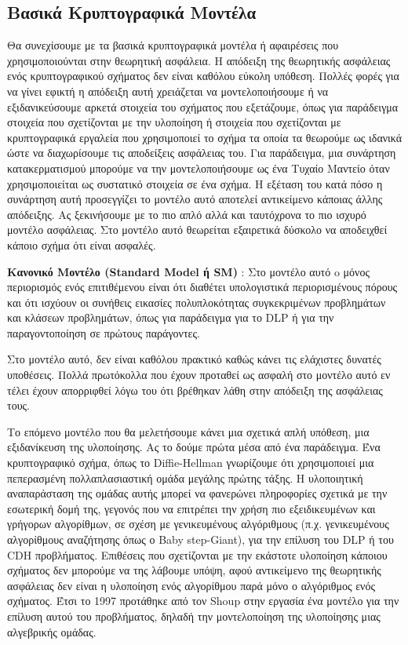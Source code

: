 \subsection{Βασικά Κρυπτογραφικά Μοντέλα}

Θα συνεχίσουμε με τα βασικά κρυπτογραφικά μοντέλα ή αφαιρέσεις που χρησιμοποιούνται στην θεωρητική ασφάλεια. Η απόδειξη της θεωρητικής ασφάλειας ενός κρυπτογραφικού σχήματος δεν είναι καθόλου εύκολη υπόθεση. Πολλές φορές για να γίνει εφικτή η απόδειξη αυτή χρειάζεται να μοντελοποιήσουμε ή να εξιδανικεύσουμε αρκετά στοιχεία του σχήματος που εξετάζουμε, όπως για παράδειγμα στοιχεία που σχετίζονται με την υλοποίηση ή στοιχεία που σχετίζονται με κρυπτογραφικά εργαλεία που χρησιμοποιεί το σχήμα τα οποία τα θεωρούμε ως ιδανικά ώστε να διαχωρίσουμε τις αποδείξεις ασφάλειας του. Για παράδειγμα, μια συνάρτηση κατακερματισμού μπορούμε να την μοντελοποιήσουμε ως ένα Τυχαίο Μαντείο όταν χρησιμοποιείται ως συστατικό στοιχεία σε ένα σχήμα. Η εξέταση του κατά πόσο η συνάρτηση αυτή προσεγγίζει το μοντέλο αυτό αποτελεί αντικείμενο κάποιας άλλης απόδειξης. Ας ξεκινήσουμε με το πιο απλό αλλά και ταυτόχρονα το πιο ισχυρό μοντέλο ασφάλειας. Στο μοντέλο αυτό θεωρείται εξαιρετικά δύσκολο να αποδειχθεί κάποιο σχήμα ότι είναι ασφαλές. 

\begin{definition}
\textbf{Κανονικό Μοντέλο (Standard Model ή SM)} : Στο μοντέλο αυτό o μόνος περιορισμός ενός επιτιθέμενου είναι ότι διαθέτει υπολογιστικά περιορισμένους πόρους και ότι ισχύουν οι συνήθεις εικασίες πολυπλοκότητας συγκεκριμένων προβλημάτων και κλάσεων προβλημάτων, όπως για παράδειγμα για το DLP ή για την παραγοντοποίηση σε πρώτους παράγοντες.
\end{definition}

Στο μοντέλο αυτό, δεν είναι καθόλου πρακτικό καθώς κάνει τις ελάχιστες δυνατές υποθέσεις. Πολλά πρωτόκολλα που έχουν προταθεί ως ασφαλή στο μοντέλο αυτό εν τέλει έχουν απορριφθεί λόγω του ότι βρέθηκαν λάθη στην απόδειξη της ασφάλειας τους.

Το επόμενο μοντέλο που θα μελετήσουμε κάνει μια σχετικά απλή υπόθεση, μια εξιδανίκευση της υλοποίησης. Ας το δούμε πρώτα μέσα από ένα παράδειγμα. Ένα κρυπτογραφικό σχήμα, όπως το Diffie-Hellman γνωρίζουμε ότι χρησιμοποιεί μια πεπερασμένη πολλαπλασιαστική ομάδα μεγάλης πρώτης τάξης. Η υλοποιητική αναπαράσταση της ομάδας αυτής μπορεί να φανερώνει πληροφορίες σχετικά με την εσωτερική δομή της, γεγονός που να επιτρέπει την χρήση πιο εξειδικευμένων και γρήγορων αλγορίθμων, σε σχέση με γενικευμένους αλγόριθμους (π.χ. γενικευμένους αλγορίθμους αναζήτησης όπως ο Baby step-Giant), για την επίλυση του DLP ή του CDH προβλήματος. Επιθέσεις που σχετίζονται με την εκάστοτε υλοποίηση κάποιου σχήματος δεν μπορούμε να της λάβουμε υπόψη, αφού αντικείμενο της θεωρητικής ασφάλειας δεν είναι η υλοποίηση ενός αλγορίθμου παρά μόνο ο αλγόριθμος ενός σχήματος. Έτσι το 1997 προτάθηκε από τον Shoup στην εργασία \cite{shoup1997lower} ένα μοντέλο για την επίλυση αυτού του προβλήματος, δηλαδή την μοντελοποίηση της υλοποίησης μιας αλγεβρικής ομάδας.

